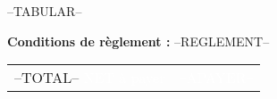 --TABULAR--

\begin{minipage}[t]{0.40\textwidth}
\begin{fminipage}
{\footnotesize \textbf{Conditions de règlement :} --REGLEMENT--}\\
\end{fminipage}
\end{minipage}
\hspace{1cm}
\begin{minipage}[t]{0.50\textwidth}
\begin{flushright}
\begin{tabular}{p{4.5cm} r}
--TOTAL--
\rowcolor{violet}\textcolor{white}{NET à payer} &\textcolor{white}{--APAYER--} \\ 
\end{tabular} 
\end{flushright}
\end{minipage}

